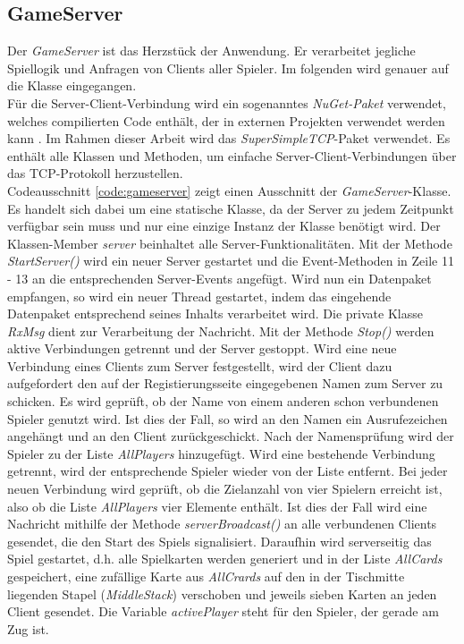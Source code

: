 \subsection{GameServer}
Der \textit{GameServer} ist das Herzstück der Anwendung. Er verarbeitet jegliche Spiellogik und Anfragen von Clients aller Spieler. Im folgenden wird genauer auf die Klasse eingegangen.\\
Für die Server-Client-Verbindung wird ein sogenanntes \textit{NuGet-Paket} verwendet, welches compilierten Code enthält, der in externen Projekten verwendet werden kann \cite{NuGet}. Im Rahmen dieser Arbeit wird das \textit{SuperSimpleTCP}-Paket verwendet. Es enthält alle Klassen und Methoden, um einfache Server-Client-Verbindungen über das TCP-Protokoll herzustellen.\\
Codeausschnitt \ref{code:gameserver} zeigt einen Ausschnitt der \textit{GameServer}-Klasse. Es handelt sich dabei um eine statische Klasse, da der Server zu jedem Zeitpunkt verfügbar sein muss und nur eine einzige Instanz der Klasse benötigt wird. Der Klassen-Member \textit{server} beinhaltet alle Server-Funktionalitäten. Mit der Methode \textit{StartServer()} wird ein neuer Server gestartet und die Event-Methoden in Zeile 11 - 13 an die entsprechenden Server-Events angefügt. Wird nun ein Datenpaket empfangen, so wird ein neuer Thread gestartet, indem das eingehende Datenpaket entsprechend seines Inhalts verarbeitet wird. Die private Klasse \textit{RxMsg} dient zur Verarbeitung der Nachricht. Mit der Methode \textit{Stop()} werden aktive Verbindungen getrennt und der Server gestoppt. Wird eine neue Verbindung eines Clients zum Server festgestellt, wird der Client dazu aufgefordert den auf der Registierungsseite eingegebenen Namen zum Server zu schicken. Es wird geprüft, ob der Name von einem anderen schon verbundenen Spieler genutzt wird. Ist dies der Fall, so wird an den Namen ein Ausrufezeichen angehängt und an den Client zurückgeschickt. Nach der Namensprüfung wird der Spieler zu der Liste \textit{AllPlayers} hinzugefügt. Wird eine bestehende Verbindung getrennt, wird der entsprechende Spieler wieder von der Liste entfernt. Bei jeder neuen Verbindung wird geprüft, ob die Zielanzahl von vier Spielern erreicht ist, also ob die Liste \textit{AllPlayers} vier Elemente enthält. Ist dies der Fall wird eine Nachricht mithilfe der Methode \textit{serverBroadcast()} an alle verbundenen Clients gesendet, die den Start des Spiels signalisiert. Daraufhin wird serverseitig das Spiel gestartet, d.h. alle Spielkarten werden generiert und in der Liste \textit{AllCards} gespeichert, eine zufällige Karte aus \textit{AllCrards} auf den in der Tischmitte liegenden Stapel (\textit{MiddleStack}) verschoben und jeweils sieben Karten an jeden Client gesendet. Die Variable \textit{activePlayer} steht für den Spieler, der gerade am Zug ist.
